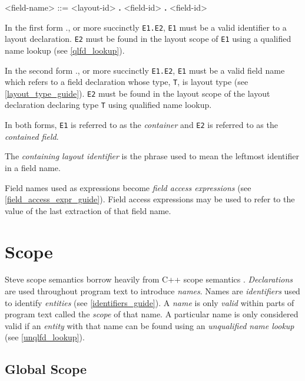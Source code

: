 \begin{minip}
\begin{grammar}
<field-name> ::=
<layout-id> \textbf{.} <field-id>
 \textbf{.} <field-id>
\end{grammar}
\end{minip}

In the first form ., or more succinctly \texttt{E1.E2}, \texttt{E1} must be a valid identifier to a layout declaration. \texttt{E2} must be found in the layout scope of \texttt{E1} using a qualified name lookup (see \ref{qlfd_lookup}).

In the second form ., or more succinctly \texttt{E1.E2}, \texttt{E1} must be a valid field name which refers to a field declaration whose type, \texttt{T}, is layout type (see \ref{layout_type_guide}). \texttt{E2} must be found in the layout scope of the layout declaration declaring type \texttt{T} using qualified name lookup.

In both forms, \texttt{E1} is referred to as the \textit{container} and \texttt{E2} is referred to as the \textit{contained field}.

The \textit{containing layout identifier} is the phrase used to mean the leftmost identifier in a field name.

Field names used as expressions become \textit{field access expressions} (see \ref{field_access_expr_guide}). Field access expressions may be used to refer to the value of the last extraction of that field name.

\section{Scope} \label{scope_guide}

Steve scope semantics borrow heavily from C++ scope semantics \cite{cpp_std}. \textit{Declarations} are used throughout program text to introduce \textit{names}. Names are \textit{identifiers} used to identify \textit{entities} (see \ref{identifiers_guide}). A \textit{name} is only \textit{valid} within parts of program text called the \textit{scope} of that name. A particular name is only considered valid if an \textit{entity} with that name can be found using an \textit{unqualified name lookup} (see \ref{unqlfd_lookup}). 

\subsection{Global Scope} \label{global_scope}

